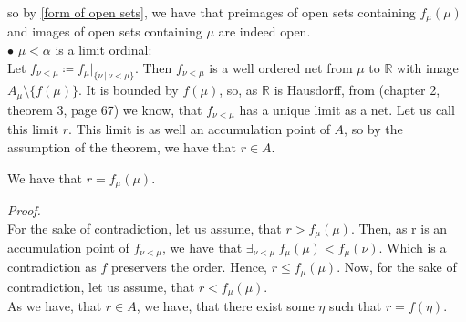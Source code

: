 so by \ref{form of open sets}, we have that preimages of open 
sets containing $f_\mu(\mu)$ and images of open sets containing $\mu$ are indeed open. \\[8pt]
$\bullet$ $\mu < \alpha$ is a limit ordinal: \\ 
Let $f_{\nu<\mu} \coloneqq f_{\mu}\Big|_{\{\nu\,|\,\nu<\mu\}}$. Then $f_{\nu < \mu}$ 
is a well ordered net from $\mu$ to $\mathbb{R}$ with image $A_\mu\setminus\{f(\mu)\}$. 
It is bounded by $f(\mu)$, so,
as $\mathbb{R}$ is Hausdorff, from \cite{Kelley1975} (chapter 2, 
theorem 3, page 67) we know, that $f_{\nu<\mu}$ has a unique limit as a net. Let us call this 
limit $r$. This limit is 
as well an accumulation point of $A$, so by the assumption of the theorem, we have that 
$r \in A$.
\begin{observation}
We have that $r = f_\mu(\mu)$.
\end{observation}
\textit{Proof.} \\
For the sake of contradiction, let us assume, that $r > f_\mu(\mu)$. 
Then, as r is an accumulation 
point of $f_{\nu<\mu}$, we have that $\exists_{\nu<\mu}\ f_\mu(\mu)<f_\mu(\nu)$. 
Which is a contradiction as $f$ preservers the order. Hence, $r \leq f_\mu(\mu)$.
Now, for the sake of contradiction, let us assume, that $r < f_\mu(\mu)$. \\
As we have, that $r \in A$, we have, that there exist some $\eta$ such that $r = f(\eta)$. 
